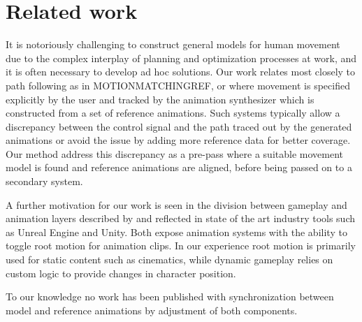 \section{Related work}
It is notoriously challenging to construct general models for human movement due to the complex interplay of planning and optimization processes at work, and it is often necessary to develop ad hoc solutions. Our work relates most closely to path following as in MOTIONMATCHINGREF, \citep{holden.16} or \citep{startke20} where movement is specified explicitly by the user and tracked by the animation synthesizer which is constructed from a set of reference animations. Such systems typically allow a discrepancy between the control signal and the path traced out by the generated animations or avoid the issue by adding more reference data for better coverage. Our method address this discrepancy as a pre-pass where a suitable movement model is found and reference animations are aligned, before being passed on to a secondary system.  

A further motivation for our work is seen in the division between gameplay and animation layers described by \citep{holden18} and reflected in state of the art industry tools such as Unreal Engine and Unity. Both expose animation systems with the ability to toggle root motion for animation clips. In our experience root motion is primarily used for static content such as cinematics, while dynamic gameplay relies on custom logic to provide changes in character position. 


To our knowledge no work has been published with synchronization between model and reference animations by adjustment of both components.

